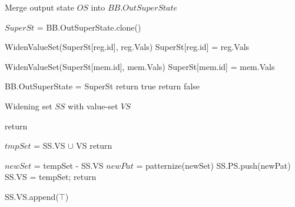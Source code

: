 \begin{algorithm}
  \caption{Merge output state $OS$ into $BB.OutSuperState$ }
  \footnotesize
  \begin{algorithmic}[1]
    \State $SuperSt$ = BB.OutSuperState.clone()

    \State
     
    \State WidenValueSet(SuperSt[reg.id], reg.Vals)
    \Else
    \State SuperSt[reg.id] = reg.Vals
    \EndIf
    \EndFor

    \State
     
    \State WidenValueSet(SuperSt[mem.id], mem.Vals)
    \Else
    \State SuperSt[mem.id] = mem.Vals
    \EndIf
    \EndFor

    \State
     
    \State BB.OutSuperState = SuperSt 
    \State return true 
    \EndIf
    \State return false 
    \EndFunction
  \end{algorithmic}
\end{algorithm}


\begin{algorithm}
  \caption{Widening set $SS$ with value-set $VS$}
  \footnotesize
  \begin{algorithmic}[1]
    \State return  
    \EndIf

    \State
    \State $tmpSet$ = SS.VS $\cup$ VS
    \State return 
    \EndIf

    \State
    \State $newSet$ = tempSet - SS.VS
    \State $newPat$ = patternize(newSet) 
    \State SS.PS.push(newPat)
    \State SS.VS = tempSet;
     
    \State return
    \EndIf

    \State
     
    \State SS.VS.append($\top$)
    \EndIf

    \EndFunction
  \end{algorithmic}
\end{algorithm}

